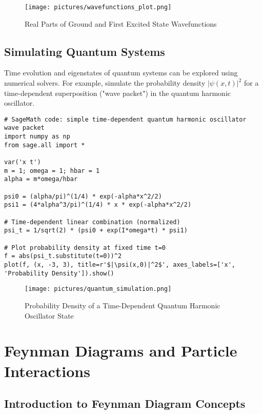 \documentclass[12pt]{book}
\begin{document}
\begin{figure}[H]
  \centering
  \texttt{[image: pictures/wavefunctions\_plot.png]}
  \caption{Real Parts of Ground and First Excited State Wavefunctions}
  \label{fig:wavefunctions_plot}
\end{figure}

\section{Simulating Quantum Systems}

Time evolution and eigenstates of quantum systems can be explored using numerical solvers. For example, simulate the probability density \(|\psi(x,t)|^2\) for a time-dependent superposition ("wave packet") in the quantum harmonic oscillator.

\begin{verbatim}
# SageMath code: simple time-dependent quantum harmonic oscillator wave packet
import numpy as np
from sage.all import *

var('x t')
m = 1; omega = 1; hbar = 1
alpha = m*omega/hbar

psi0 = (alpha/pi)^(1/4) * exp(-alpha*x^2/2)
psi1 = (4*alpha^3/pi)^(1/4) * x * exp(-alpha*x^2/2)

# Time-dependent linear combination (normalized)
psi_t = 1/sqrt(2) * (psi0 + exp(I*omega*t) * psi1)

# Plot probability density at fixed time t=0
f = abs(psi_t.substitute(t=0))^2
plot(f, (x, -3, 3), title=r'$|\psi(x,0)|^2$', axes_labels=['x', 'Probability Density']).show()
\end{verbatim}

\begin{figure}[H]
  \centering
  \texttt{[image: pictures/quantum\_simulation.png]}
  \caption{Probability Density of a Time-Dependent Quantum Harmonic Oscillator State}
  \label{fig:quantum_simulation}
\end{figure}

\chapter{Feynman Diagrams and Particle Interactions}

\section{Introduction to Feynman Diagram Concepts}
\end{document}
